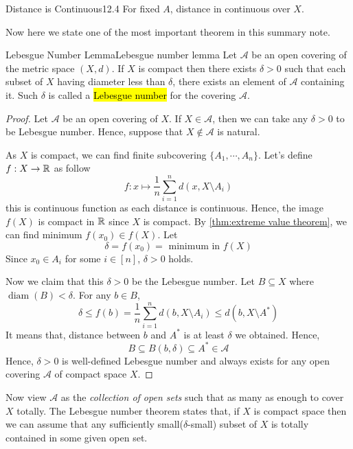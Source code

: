 \documentclass[12pt, a4paper, twoside]{article}
\newcommand{\CA}{{\mathcal {A}}} \newcommand{\CB}{{\mathcal {B}}}
\theoremstyle{plain}
\begin{document}
\begin{rem}{Distance is Continuous}{12.4}
    For fixed $A$, distance in continuous over $X$. 
\end{rem}

Now here we state one of the most important theorem in this summary note. 

\newpage

\begin{thm}{Lebesgue Number Lemma}{Lebesgue number lemma}
    Let $\CA$ be an open covering of the metric space $(X, d)$. 
    If $X$ is compact then there exists $\delta > 0$ such that 
    each subset of $X$ having diameter less than $\delta$, there exists an element of $\CA$ containing it. 
    Such $\delta$ is called a \hl{Lebesgue number} for the covering $\CA$. 
\end{thm}

\begin{proof}
    Let $\CA$ be an open covering of $X$. 
    If $X \in \CA$, then we can take any $\delta > 0$ to be Lebesgue number. Hence, 
    suppose that $X \notin \CA$ is natural. 

    As $X$ is compact, we can find finite subcovering $\{A_1, \cdots, A_n\}$. 
    Let's define $f: X \rightarrow {\mathbb {R}}$ as follow
    \[f: x \mapsto \frac{1}{n} \sum_{i = 1}^{n} d(x, X \setminus A_i)\]
    this is continuous function as each distance is continuous. 
    Hence, the image $f(X)$ is compact in ${\mathbb {R}}$ since $X$ is compact. 
    By \ref{thm:extreme value theorem}, we can find minimum $f(x_0) \in f(X)$. 
    Let 
    \[\delta = f(x_0) = \text{ minimum in } f(X)\]
    Since $x_0 \in A_i$ for some $i \in [n]$, $\delta > 0$ holds.

    Now we claim that this $\delta > 0$ be the Lebesgue number. 
    Let $B \subseteq X$ where $\operatorname{diam}(B) < \delta$. 
    For any $b \in B$, 
    \[\delta \leq f(b) = \frac{1}{n} \sum_{i = 1}^{n} d(b, X \setminus A_i) \leq d(b, X \setminus A^*)\]
    It means that, distance between $b$ and $A^*$ is at least $\delta$ we obtained. 
    Hence, 
    \[B \subseteq B(b, \delta) \subseteq A^* \in \CA\]
    Hence, $\delta > 0$ is well-defined Lebesgue number and always exists for any open covering $\CA$ of 
    compact space $X$. 
\end{proof}

Now view $\CA$ as the \textit{collection of open sets} such that as many as enough to cover $X$ totally. 
The Lebesgue number theorem states that, if $X$ is compact space then 
we can assume that any sufficiently small($\delta$-small) subset of $X$ is totally contained in some given open set. 
\end{document}
